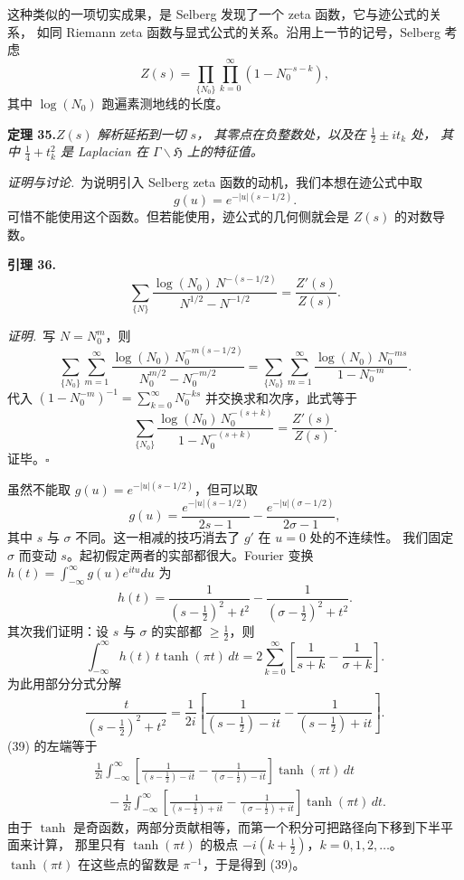 这种类似的一项切实成果，是 Selberg 发现了一个 zeta 函数，它与迹公式的关系，
如同 Riemann zeta 函数与显式公式的关系。沿用上一节的记号，Selberg 考虑
\[
Z(s)=\prod_{\{N_{0}\}}\prod_{k=0}^{\infty}(1-N_{0}^{-s-k}),
\]
其中 $\log(N_{0})$ 跑遍素测地线的长度。

\par\medskip\noindent\textbf{定理 35.}\quad\emph{$Z(s)$ 解析延拓到一切 $s$，
其零点在负整数处，以及在 $\tfrac12\pm it_{k}$ 处，
其中 $\tfrac14+t_{k}^{2}$ 是 Laplacian 在 $\Gamma\backslash\mathfrak{H}$ 上的特征值。}

\smallskip
\noindent\emph{证明与讨论.}\ 为说明引入 Selberg zeta 函数的动机，我们本想在迹公式中取
\[
g(u)=e^{-|u|(s-1/2)} .
\]
可惜不能使用这个函数。但若能使用，迹公式的几何侧就会是 $Z(s)$ 的对数导数。

\par\medskip\noindent\textbf{引理 36.}\quad
\[
\sum_{\{N\}}\frac{\log(N_{0})\,N^{-(s-1/2)}}{N^{1/2}-N^{-1/2}}=\frac{Z'(s)}{Z(s)} .
\]

\smallskip
\noindent\emph{证明.}\ 写 $N=N_{0}^{m}$，则
\[
\sum_{\{N_{0}\}}\sum_{m=1}^{\infty}
\frac{\log(N_{0})\,N_{0}^{-m(s-1/2)}}{N_{0}^{m/2}-N_{0}^{-m/2}}
=\sum_{\{N_{0}\}}\sum_{m=1}^{\infty}
\frac{\log(N_{0})\,N_{0}^{-ms}}{1-N_{0}^{-m}} .
\]
代入 $(1-N_{0}^{-m})^{-1}=\sum_{k=0}^{\infty}N_{0}^{-ks}$ 并交换求和次序，此式等于
\[
\sum_{\{N_{0}\}}\frac{\log(N_{0})\,N_{0}^{-(s+k)}}{1-N_{0}^{-(s+k)}}=\frac{Z'(s)}{Z(s)} .
\]
证毕。\hfill$\square$

虽然不能取 $g(u)=e^{-|u|(s-1/2)}$，但可以取
\[
g(u)=\frac{e^{-|u|(s-1/2)}}{2s-1}-\frac{e^{-|u|(\sigma-1/2)}}{2\sigma-1},
\]
其中 $s$ 与 $\sigma$ 不同。这一相减的技巧消去了 $g'$ 在 $u=0$ 处的不连续性。
我们固定 $\sigma$ 而变动 $s$。起初假定两者的实部都很大。Fourier 变换
$h(t)=\int_{-\infty}^{\infty}g(u)e^{itu}du$ 为
\[
h(t)=\frac{1}{\left(s-\frac12\right)^{2}+t^{2}}
-\frac{1}{\left(\sigma-\frac12\right)^{2}+t^{2}} .
\]
其次我们证明：设 $s$ 与 $\sigma$ 的实部都 $\ge\tfrac12$，则
\begin{equation}\tag{39}
\int_{-\infty}^{\infty}h(t)\,t\tanh(\pi t)\,dt
=2\sum_{k=0}^{\infty}\left[\frac{1}{s+k}-\frac{1}{\sigma+k}\right].
\end{equation}
为此用部分分式分解
\[
\frac{t}{\left(s-\frac12\right)^{2}+t^{2}}
=\frac{1}{2i}\left[\frac{1}{\left(s-\frac12\right)-it}
-\frac{1}{\left(s-\frac12\right)+it}\right].
\]
(39) 的左端等于
\[
\begin{aligned}
&\frac{1}{2i}\int_{-\infty}^{\infty}\left[
\frac{1}{\left(s-\frac12\right)-it}-\frac{1}{\left(\sigma-\frac12\right)-it}\right]
\tanh(\pi t)\,dt\\
&\quad-\frac{1}{2i}\int_{-\infty}^{\infty}\left[
\frac{1}{\left(s-\frac12\right)+it}-\frac{1}{\left(\sigma-\frac12\right)+it}\right]
\tanh(\pi t)\,dt .
\end{aligned}
\]
由于 $\tanh$ 是奇函数，两部分贡献相等，而第一个积分可把路径向下移到下半平面来计算，
那里只有 $\tanh(\pi t)$ 的极点 $-i\left(k+\frac12\right)$，$k=0,1,2,\dots$。
$\tanh(\pi t)$ 在这些点的留数是 $\pi^{-1}$，于是得到 (39)。

